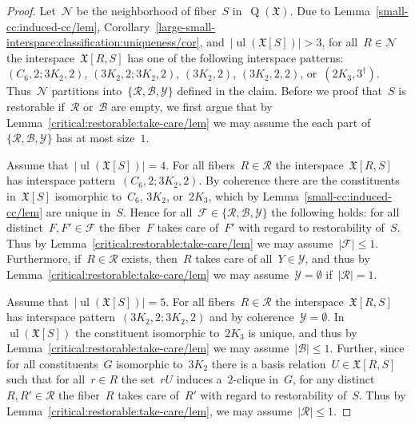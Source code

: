 \documentclass[english,a4paper]{article}
\theoremstyle{plain}
\theoremstyle{definition}
\newcommand{\abs}[1]{| #1 |}
\newcommand{\coherentConfig}{\ensuremath{\mathfrak{X}}}
\newcommand{\interspace}[2]{\ensuremath{\coherentConfig[#1,#2]}}
\newcommand{\inducedCC}[1]{\ensuremath{\coherentConfig[#1]}}
\DeclareMathOperator*{\ul}{ul}
\DeclareMathOperator*{\Quotient}{Q}
\newcommand{\quotientGraph}[1]{\ensuremath{\Quotient(#1)}}
\newcommand{\ipsixMatching}             {\ensuremath{(\disjointCliques{3}{2},2)}}
\newcommand{\ipsixMatchingTwice}        {\ensuremath{(\disjointCliques{3}{2},2,2)}}
\newcommand{\ipsixMatchingMatching}     {\ensuremath{(\disjointCliques{3}{2},2;\disjointCliques{3}{2},2)}}
\newcommand{\ipsixMatchingAndCycle}     {\ensuremath{(\cycle{6},2;\disjointCliques{3}{2},2)}}
\newcommand{\ipsixTriangle}               {\ensuremath{(\disjointCliques{2}{3},3^\dag)}}
\newcommand{\clique}[1]{\ensuremath{K_{#1}}}
\newcommand{\cycle}[1]{\ensuremath{C_{#1}}}
\newcommand{\disjointCliques}[2]{\ensuremath{#1 \clique{#2}}}
\begin{document}
\begin{proof}
    Let~$\mathcal{N}$ be the neighborhood of fiber~$S$ in~$\quotientGraph{\coherentConfig}$.
    Due to Lemma~\ref{small-cc:induced-cc/lem}, Corollary~\ref{large-small-interspace:classification:uniqueness/cor}, and~$\abs{\ul(\inducedCC{S})} > 3$, for all~$R \in \mathcal{N}$ the interspace~$\interspace{R}{S}$ has one of the following interspace patterns:
    $\ipsixMatchingAndCycle$, $\ipsixMatchingMatching$, $\ipsixMatching$, $\ipsixMatchingTwice$, or~$\ipsixTriangle$.
    Thus~$\mathcal{N}$ partitions into~$\{\mathcal{R},\mathcal{B}, \mathcal{Y}\}$ defined in the claim.
    Before we proof that~$S$ is restorable if~$\mathcal{R}$ or~$\mathcal{B}$ are empty, we first argue that by Lemma~\ref{critical:restorable:take-care/lem} we may assume the each part of~$\{\mathcal{R},\mathcal{B}, \mathcal{Y}\}$ has at most size~$1$.

    Assume that~$|\ul(\inducedCC{S})| = 4$.
    For all fibers~$R \in \mathcal{R}$ the interspace~$\interspace{R}{S}$ has interspace pattern~$\ipsixMatchingAndCycle$.
    By coherence there are the constituents in~$\inducedCC{S}$ isomorphic to~$\cycle{6}$, $\disjointCliques{3}{2}$, or~$\disjointCliques{2}{3}$, which by Lemma~\ref{small-cc:induced-cc/lem} are unique in~$S$.
    Hence for all~$\mathcal{F} \in \{\mathcal{R},\mathcal{B}, \mathcal{Y}\}$ the following holds:
    for all distinct~$F,F' \in \mathcal{F}$ the fiber~$F$ takes care of~$F'$ with regard to restorability of~$S$.
    Thus by Lemma~\ref{critical:restorable:take-care/lem} we may assume~$|\mathcal{F}| \leq 1$.
    Furthermore, if~$R \in \mathcal{R}$ exists, then~$R$ takes care of all~$Y \in \mathcal{Y}$, and thus by Lemma~\ref{critical:restorable:take-care/lem} we may assume~$\mathcal{Y} = \emptyset$ if~$|\mathcal{R}| = 1$.

    Assume that~$|\ul(\inducedCC{S})| = 5$.
    For all fibers~$R \in \mathcal{R}$ the interspace~$\interspace{R}{S}$ has interspace pattern~$\ipsixMatchingMatching$ and by coherence~$\mathcal{Y} = \emptyset$.
    In~$\ul(\inducedCC{S})$ the constituent isomorphic to~$\disjointCliques{2}{3}$ is unique, and thus by Lemma~\ref{critical:restorable:take-care/lem} we may assume~$|\mathcal{B}| \leq 1$.
    Further, since for all constituents~$G$ isomorphic to~$\disjointCliques{3}{2}$ there is a basis relation~$U \in \interspace{R}{S}$ such that for all~$r \in R$ the set~$rU$ induces a~$2$-clique in~$G$, for any distinct~$R,R' \in \mathcal{R}$ the fiber~$R$ takes care of~$R'$ with regard to restorability of~$S$.
    Thus by Lemma~\ref{critical:restorable:take-care/lem}, we may assume~$|\mathcal{R}| \leq 1$.


\end{proof}
\end{document}
